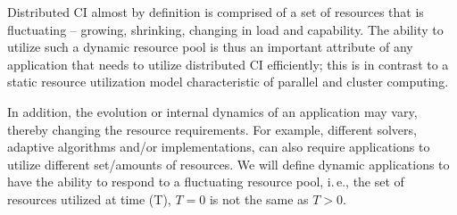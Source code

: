 \documentclass[conference,final]{IEEEtran}
\newcommand{\jhanote}[1]{ {\textcolor{red} { ***shantenu: #1 }}}
\newcommand{\alnote}[1]{ {\textcolor{blue} { ***andre: #1 }}}
\newcommand{\alnote}[1]{}
\newcommand{\jhanote}[1]{}
\begin{document}
Distributed CI almost by definition is comprised of a set of resources
that is fluctuating -- growing, shrinking, changing in load and
capability.  The ability to utilize such a dynamic resource pool is
thus an important attribute of any application that needs to utilize
distributed CI efficiently; this is in contrast to a static resource
utilization model characteristic of parallel and cluster computing.

In addition, the evolution or internal dynamics of an application may
vary, thereby changing the resource requirements.
For example, different solvers, %
adaptive algorithms and/or implementations, can also require
applications to utilize different set/amounts of resources.
We will define dynamic applications to have the ability to respond to
a fluctuating resource pool, i.\,e., the set of resources utilized at
time (T), $T=0$ is not the same as $T>0$.








\end{document}
